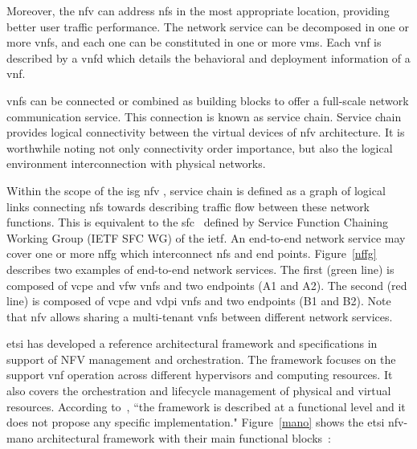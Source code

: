 Moreover, the \gls{nfv} can address \glspl{nf} in the most appropriate location, providing better user traffic performance. The network service can be decomposed in one or more \glspl{vnf}, and each one can be constituted in one or more \glspl{vm}. Each \gls{vnf} is described by a \gls{vnfd} which details the behavioral and deployment information of a \gls{vnf}.

\glspl{vnf} can be connected or combined as building blocks to offer a full-scale network communication service. This connection is known as service chain. Service chain provides logical connectivity between the virtual devices of \gls{nfv} architecture. It is worthwhile noting not only connectivity order importance, but also the logical environment interconnection with physical networks. 

Within the scope of the \gls{isg} \gls{nfv} \cite{ETSIIndustrySpecificationGroupISGNFV2014NetworkNFV}, service chain is defined as a graph of logical links connecting \glspl{nf} towards describing traffic flow between these network functions. This is equivalent to the \gls{sfc}~\cite{Halpern2015} defined by Service Function Chaining Working Group (IETF SFC WG) of the \gls{ietf}.  
An end-to-end network service may cover one or more \gls{nffg} which interconnect \glspl{nf} and end points.  Figure~\ref{nffg} describes two examples of end-to-end network services. The first (green line) is composed of \gls{vcpe} and \gls{vfw} \glspl{vnf} and two endpoints (A1 and A2). The second (red line) is composed of \gls{vcpe} and \gls{vdpi} \glspl{vnf} and two endpoints (B1 and B2). Note that \gls{nfv} allows sharing a multi-tenant \glspl{vnf} between different network services. 

\gls{etsi} has developed a reference architectural framework and specifications in support of NFV management and orchestration. The framework focuses on the support \gls{vnf} operation across different hypervisors and computing resources. It also covers the orchestration and lifecycle management of physical and virtual resources. According to~\cite{ETSIIndustrySpecificationGroupISGNFV2013NetworkFramework}, ``the framework is described at a functional level and it does not propose any specific implementation." Figure~\ref{mano} shows the \gls{etsi} \gls{nfv}-\acrfull{mano} architectural framework with their main functional blocks~\cite{ETSIIndustrySpecificationGroupISGNFV2014NetworkOptions}:

